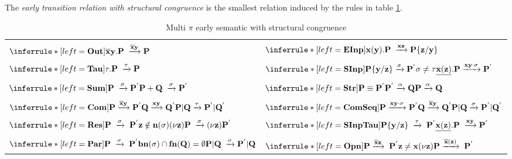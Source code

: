 \begin{definition}
  The \emph{early transition relation with structural congruence} is the smallest relation induced by the rules in table \ref{multipisoloinputearlywith}.
  \begin{table}
    \begin{tabular}{ll}
	  \hline\\
	  $\inferrule* [left=\bf{Out}]{
	  }{
	    \overline{x}y.P \;\xrightarrow{\overline{x}y} P
	  }$
	&
	  $\inferrule* [left=\bf{EInp}]{
	  }{
	    x(y).P \;\xrightarrow{xz} P\{z/y\}
	  }$
      \\\\
	  $\inferrule* [left=\bf{Tau}]{
	  }{
	    \tau.P \;\xrightarrow{\tau} P
	  }$
	&
	  $\inferrule* [left=\bf{SInp}]{
	      P\{y/z\} \xrightarrow{\sigma} P^{'}
	    \\
	      \sigma\neq \tau
	  }{
	    \underline{x(z)}.P \xrightarrow{xy \cdot \sigma} P^{'}
	  }$
      \\\\
	  $\inferrule* [left=\bf{Sum}]{
	    P \;\xrightarrow{\sigma} P^{'}
	  }{
	    P+Q \;\xrightarrow{\sigma} P^{'}
	  }$
	&
	  $\inferrule* [left=\bf{Str}]{
	      P\equiv P^{'}
	    \\
	      P^{'} \xrightarrow{\alpha} Q
	  }{
	      P \xrightarrow{\alpha} Q
	  }$
      \\\\
	  $\inferrule* [left=\bf{Com}]{
	      P \xrightarrow{\overline{x}y} P^{'}
	    \\
	      Q \xrightarrow{xy} Q^{'}
	  }{
	    P|Q \xrightarrow{\tau} P^{'}|Q^{'}
	  }$
	&
	  $\inferrule* [left=\bf{ComSeq}]{
	      P \xrightarrow{xy\cdot \sigma} P^{'}
	    \\
	      Q \xrightarrow{\overline{x}y} Q^{'}
	  }{
	    P|Q \xrightarrow{\sigma} P^{'}|Q^{'}
	  }$
      \\\\
	  $\inferrule* [left=\bf{Res}]{
	      P\; \xrightarrow{\sigma}\; P^{'}
	    \\
	      z\notin n(\sigma)
	  }{
	    (\nu z) P \;\xrightarrow{\sigma} (\nu z) P^{'}
	  }$
	&
	  $\inferrule* [left=\bf{SInpTau}]{
	      P\{y/z\}\; \xrightarrow{\tau}\; P^{'}
	  }{
	    \underline{x(z)}.P \;\xrightarrow{xy} P^{'}
	  }$
      \\\\
	  $\inferrule* [left=\bf{Par}]{
	      P \;\xrightarrow{\sigma}\; P^{'}
	    \\ 
	      bn(\sigma)\cap fn(Q)=\emptyset
	  }{
	      P|Q \;\xrightarrow{\sigma} P^{'}|Q
	  }$
	&
	  $\inferrule* [left=\bf{Opn}]{
	      P \xrightarrow{\overline{x}z}\; P^{'}
	    \\ 
	      z\neq x
	  }{
	      (\nu z)P \xrightarrow{\overline{x}(z)}\; P^{'}
	  }$
      \\\hline
    \end{tabular}
    \caption{Multi $\pi$ early semantic with structural congruence}
    \label{multipisoloinputearlywith}
  \end{table}
\end{definition}
